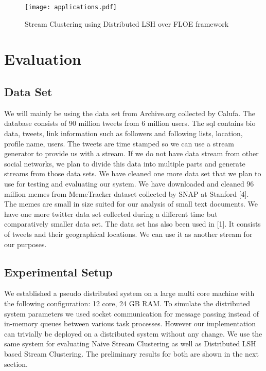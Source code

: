 \documentclass{article} %
\begin{document}
\begin{figure}[!ht]
\centering
\texttt{[image: applications.pdf]}
\caption{Stream Clustering using Distributed LSH over FLOE framework}
\label{fig:design}
\end{figure}


\section{Evaluation}
\label{sec:results}

\subsection{Data Set}
We will mainly be using the data set from Archive.org collected by Calufa. The database consists of 90 million tweets from 6 million users. The sql contains bio data, tweets, link information such as followers and following lists, location, profile name, users. The tweets are time stamped so we can use a stream generator to provide us with a stream. If we do not have data stream from other social networks, we plan to divide this data into multiple parts and generate streams from those data sets.
We have cleaned one more data set that we plan to use for testing and evaluating our system. We have downloaded and cleaned 96 million memes from MemeTracker dataset collected by SNAP at Stanford [4]. The memes are small in size suited for our analysis of small text documents.
We have one more twitter data set collected during a different time but comparatively smaller data set. The data set has also been used in [1]. It consists of tweets and their geographical locations. We can use it as another stream for our purposes.

\subsection{Experimental Setup}
We established a pseudo distributed system on a large multi core machine with the following configuration: 12 core, 24 GB RAM. To simulate the distributed system parameters we used socket communication for message passing instead of in-memory queues between various task processes. However our implementation can trivially be deployed on a distributed system without any change. We use the same system for evaluating Naive Stream Clustering as well as Distributed LSH based Stream Clustering. The preliminary results for both are shown in the next section.
\end{document}
